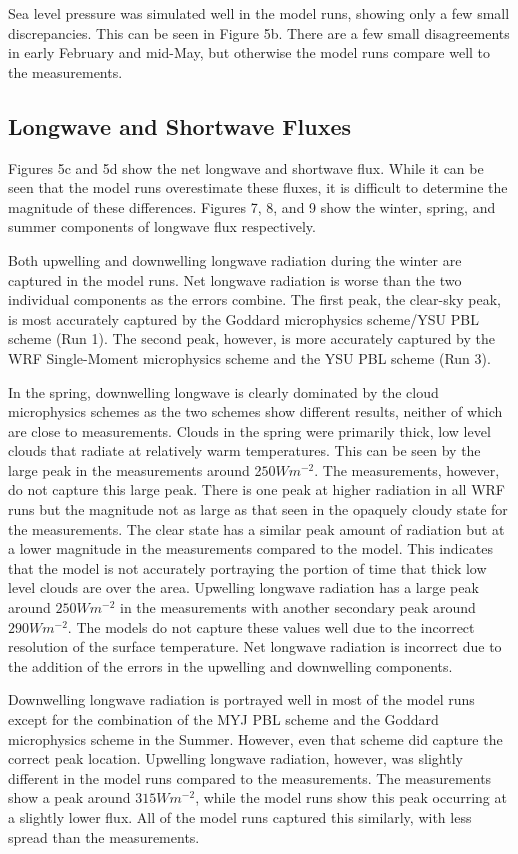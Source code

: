 Sea level pressure was simulated well in the model runs, showing only a few small discrepancies. This can be seen in Figure 5b. There are a few small disagreements in early February and mid-May, but otherwise the model runs compare well to the measurements.


\subsection{Longwave and Shortwave Fluxes}
Figures 5c and 5d show the net longwave and shortwave flux. While it can be seen that the model runs overestimate these fluxes, it is difficult to determine the magnitude of these differences. Figures 7, 8, and 9 show the winter, spring, and summer components of longwave flux respectively. 

Both upwelling and downwelling longwave radiation during the winter are captured in the model runs. Net longwave radiation is worse than the two individual components as the errors combine. The first peak, the clear-sky peak, is most accurately captured by the Goddard microphysics scheme/YSU PBL scheme (Run 1). The second peak, however, is more accurately captured by the WRF Single-Moment microphysics scheme and the YSU PBL scheme (Run 3). 

In the spring, downwelling longwave is clearly dominated by the cloud microphysics schemes as the two schemes show different results, neither of which are close to measurements. Clouds in the spring were primarily thick, low level clouds that radiate at relatively warm temperatures. This can be seen by the large peak in the measurements around 2$50 Wm^{-2}$. The measurements, however, do not capture this large peak. There is one peak at higher radiation in all WRF runs but the magnitude not as large as that seen in the opaquely cloudy state for the measurements. The clear state has a similar peak amount of radiation but at a lower magnitude in the measurements compared to the model. This indicates that the model is not accurately portraying the portion of time that thick low level clouds are over the area. Upwelling longwave radiation has a large peak around $250 Wm^{-2}$ in the measurements with another secondary peak around $290 Wm^{-2}$. The models do not capture these values well due to the incorrect resolution of the surface temperature. Net longwave radiation is incorrect due to the addition of the errors in the upwelling and downwelling components. 

Downwelling longwave radiation is portrayed well in most of the model runs except for the combination of the MYJ PBL scheme and the Goddard microphysics scheme in the Summer. However, even that scheme did capture the correct peak location. Upwelling longwave radiation, however, was slightly different in the model runs compared to the measurements. The measurements show a peak around $315 Wm^{-2}$, while the model runs show this peak occurring at a slightly lower flux. All of the model runs captured this similarly, with less spread than the measurements.

